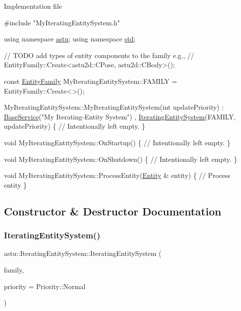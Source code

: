 Implementation file 
\begin{DoxyCodeInclude}
\textcolor{preprocessor}{#include "MyIteratingEntitySystem.h"}

\textcolor{keyword}{using namespace }\hyperlink{namespaceastu}{astu};
\textcolor{keyword}{using namespace }\hyperlink{namespacestd}{std};

\textcolor{comment}{// TODO add types of entity components to the family e.g.,}
\textcolor{comment}{// EntityFamily::Create<astu2d::CPose, astu2d::CBody>();}

\textcolor{keyword}{const} \hyperlink{classastu_1_1EntityFamily}{EntityFamily} MyIteratingEntitySystem::FAMILY = EntityFamily::Create<>();

MyIteratingEntitySystem::MyIteratingEntitySystem(\textcolor{keywordtype}{int} updatePriority)
    : \hyperlink{classastu_1_1BaseService}{BaseService}(\textcolor{stringliteral}{"My Iterating-Entity System"})
    , \hyperlink{classastu_1_1IteratingEntitySystem}{IteratingEntitySystem}(FAMILY, updatePriority)    
\{
    \textcolor{comment}{// Intentionally left empty.}
\}

\textcolor{keywordtype}{void} MyIteratingEntitySystem::OnStartup()
\{
    \textcolor{comment}{// Intentionally left empty.}
\}

\textcolor{keywordtype}{void} MyIteratingEntitySystem::OnShutdown()
\{
    \textcolor{comment}{// Intentionally left empty.}
\}

\textcolor{keywordtype}{void} MyIteratingEntitySystem::ProcessEntity(\hyperlink{classastu_1_1Entity}{Entity} & entity)
\{
    \textcolor{comment}{// Process entity    }
\}
\end{DoxyCodeInclude}
 

\subsection{Constructor \& Destructor Documentation}
\mbox{\label{classastu_1_1IteratingEntitySystem_a309f14cfea4b5786ca3e41907f3fb41d}} 
\subsubsection{\texorpdfstring{Iterating\+Entity\+System()}{IteratingEntitySystem()}}
{\footnotesize\ttfamily astu\+::\+Iterating\+Entity\+System\+::\+Iterating\+Entity\+System (\begin{DoxyParamCaption}\item[{const \hyperlink{classastu_1_1EntityFamily}{Entity\+Family} \&}]{family,  }\item[{int}]{priority = {\ttfamily Priority\+:\+:Normal} }\end{DoxyParamCaption})\hspace{0.3cm}{\ttfamily [inline]}}

